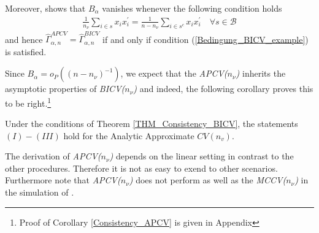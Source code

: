 \documentclass[Research_Module_ES.tex]{subfiles}
\begin{document}
Moreover, \cite{shao} shows that $B_\alpha$ vanishes whenever the following condition holds
\begin{align}
\label{Bedingung_BICV_example}
	\frac{1}{n_\nu}\sum_{i\in s}x_i x_i^\prime=\frac{1}{n-n_\nu}\sum_{i\in s^c}x_i x_i^\prime\quad \forall s\in\mathcal{B}
\end{align}
and hence $\hat{\Gamma}_{\alpha,n}^{APCV}=\hat{\Gamma}_{\alpha,n}^{BICV}$ if and only if condition (\ref{Bedingung_BICV_example}) is satisfied.

Since $B_\alpha=o_P((n-n_\nu)^{-1})$, we expect that the \textit{APCV($n_\nu$)} inherits the asymptotic properties of \textit{BICV($n_\nu$)} and indeed, the following corollary proves this to be right.\footnote{Proof of Corollary \ref{Consistency_APCV} is given in Appendix }
\begin{coro}
\label{Consistency_APCV}
Under the conditions of Theorem \ref{THM_Consistency_BICV}, the statements $(I)-(III)$ hold for the Analytic Approximate $CV(n_v)$.
\end{coro}
The derivation of \textit{APCV($n_\nu$)} depends on the linear setting in contrast to the other procedures. Therefore it is not as easy to exend to other scenarios.
Furthermore note that \textit{APCV($n_\nu$)} does not perform as well as the \textit{MCCV($n_\nu$)} in the simulation of \cite{shao}.
\end{document}
